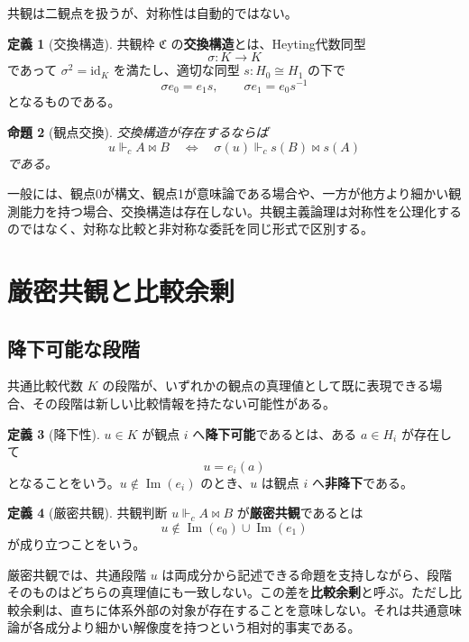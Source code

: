 \documentclass[a4paper,11pt]{ltjsarticle}
\theoremstyle{definition}
\newtheorem{definition}{定義}[section]
\theoremstyle{plain}
\newtheorem{proposition}[definition]{命題}
\newcommand{\Img}{\operatorname{Im}}
\newcommand{\forcesc}{\Vdash_{\!c}}
\begin{document}
共観は二観点を扱うが、対称性は自動的ではない。

\begin{definition}[交換構造]
共観枠 $\mathfrak C$ の\textbf{交換構造}とは、Heyting代数同型
\[
 \sigma:K\longrightarrow K
\]
であって $\sigma^2=\mathrm{id}_K$ を満たし、適切な同型 $s:H_0\cong H_1$ の下で
\[
 \sigma e_0=e_1s,
 \qquad
 \sigma e_1=e_0s^{-1}
\]
となるものである。
\end{definition}

\begin{proposition}[観点交換]
交換構造が存在するならば
\[
 u\forcesc A\bowtie B
 \quad\Longleftrightarrow\quad
 \sigma(u)\forcesc s(B)\bowtie s(A)
\]
である。
\end{proposition}

一般には、観点0が構文、観点1が意味論である場合や、一方が他方より細かい観測能力を持つ場合、交換構造は存在しない。共観主義論理は対称性を公理化するのではなく、対称な比較と非対称な委託を同じ形式で区別する。

\section{厳密共観と比較余剰}

\subsection{降下可能な段階}

共通比較代数 $K$ の段階が、いずれかの観点の真理値として既に表現できる場合、その段階は新しい比較情報を持たない可能性がある。

\begin{definition}[降下性]
$u\in K$ が観点 $i$ へ\textbf{降下可能}であるとは、ある $a\in H_i$ が存在して
\[
 u=e_i(a)
\]
となることをいう。$u\notin\Img(e_i)$ のとき、$u$ は観点 $i$ へ\textbf{非降下}である。
\end{definition}

\begin{definition}[厳密共観]
共観判断 $u\forcesc A\bowtie B$ が\textbf{厳密共観}であるとは
\[
 u\notin\Img(e_0)\cup\Img(e_1)
 \label{eq:strict-cotuition}
\]
が成り立つことをいう。
\end{definition}

厳密共観では、共通段階 $u$ は両成分から記述できる命題を支持しながら、段階そのものはどちらの真理値にも一致しない。この差を\textbf{比較余剰}と呼ぶ。ただし比較余剰は、直ちに体系外部の対象が存在することを意味しない。それは共通意味論が各成分より細かい解像度を持つという相対的事実である。
\end{document}
